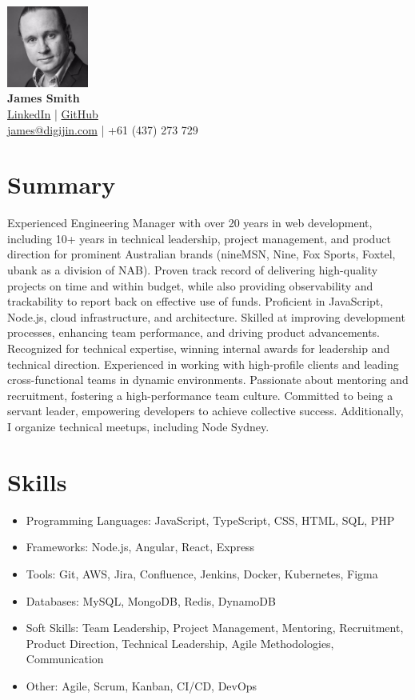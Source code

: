 \documentclass[a4paper,10pt]{article}
\begin{document}
\begin{center}
    \includegraphics[width=0.2\textwidth]{src/profile.jpg} \\ %
    {\Huge \textbf{James Smith}} \\
    \href{https://www.linkedin.com/in/digijin/}{LinkedIn} | \href{https://github.com/digijin}{GitHub} \\
    \href{mailto:james@digijin.com}{james@digijin.com} | +61 (437) 273 729
\end{center}

\section*{Summary}
Experienced Engineering Manager with over 20 years in web development, including 10+ years in technical leadership, project management, and product direction for prominent Australian brands (nineMSN, Nine, Fox Sports, Foxtel, ubank as a division of NAB). Proven track record of delivering high-quality projects on time and within budget, while also providing observability and trackability to report back on effective use of funds. Proficient in JavaScript, Node.js, cloud infrastructure, and architecture. Skilled at improving development processes, enhancing team performance, and driving product advancements. Recognized for technical expertise, winning internal awards for leadership and technical direction. Experienced in working with high-profile clients and leading cross-functional teams in dynamic environments. Passionate about mentoring and recruitment, fostering a high-performance team culture. Committed to being a servant leader, empowering developers to achieve collective success. Additionally, I organize technical meetups, including Node Sydney.

\section*{Skills}
\begin{itemize}
    \item Programming Languages: JavaScript, TypeScript, CSS, HTML, SQL, PHP
    \item Frameworks: Node.js, Angular, React, Express
    \item Tools: Git, AWS, Jira, Confluence, Jenkins, Docker, Kubernetes, Figma
    \item Databases: MySQL, MongoDB, Redis, DynamoDB
    \item Soft Skills: Team Leadership, Project Management, Mentoring, Recruitment, Product Direction, Technical Leadership, Agile Methodologies, Communication
    \item Other: Agile, Scrum, Kanban, CI/CD, DevOps
\end{itemize}
\end{document}
